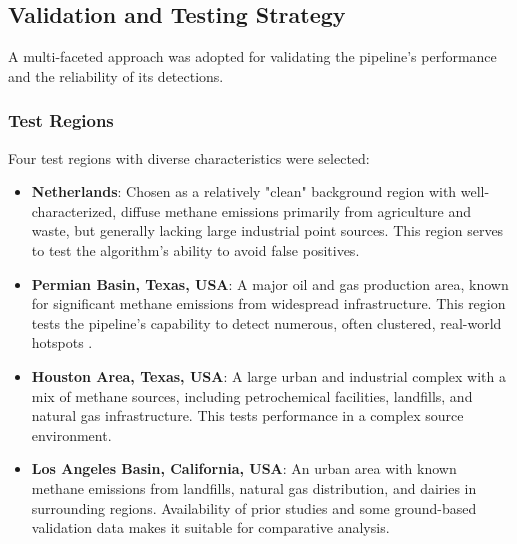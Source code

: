 \documentclass[12pt,a4paper]{article}
\begin{document}
\subsection{Validation and Testing Strategy}
A multi-faceted approach was adopted for validating the pipeline's performance and the reliability of its detections.

\subsubsection{Test Regions}
Four test regions with diverse characteristics were selected:
\begin{itemize}
    \item \textbf{Netherlands}: Chosen as a relatively "clean" background region with well-characterized, diffuse methane emissions primarily from agriculture and waste, but generally lacking large industrial point sources. This region serves to test the algorithm's ability to avoid false positives.
    \item \textbf{Permian Basin, Texas, USA}: A major oil and gas production area, known for significant methane emissions from widespread infrastructure. This region tests the pipeline's capability to detect numerous, often clustered, real-world hotspots \citep{Zhang2020Permian}.
    \item \textbf{Houston Area, Texas, USA}: A large urban and industrial complex with a mix of methane sources, including petrochemical facilities, landfills, and natural gas infrastructure. This tests performance in a complex source environment.
    \item \textbf{Los Angeles Basin, California, USA}: An urban area with known methane emissions from landfills, natural gas distribution, and dairies in surrounding regions. Availability of prior studies and some ground-based validation data makes it suitable for comparative analysis.
\end{itemize}
\end{document}

